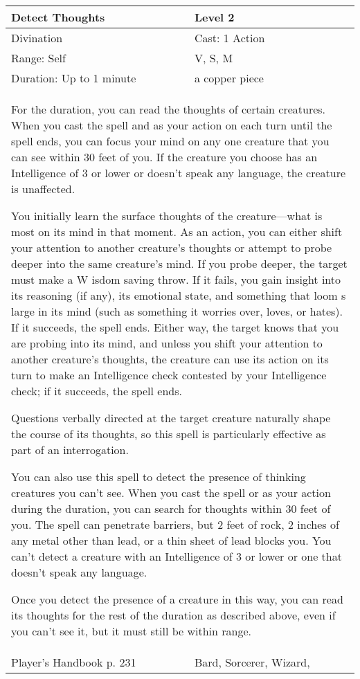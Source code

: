 \documentclass[11pt]{report}
\begin{document}
\begin{table}[H]
	\begin{tabular}{||p{6cm}|p{6cm}||}
		\hline\hline
		\bf{Detect Thoughts} & Level 2\\ \hline
		Divination & Cast: 1 Action\\ \hline
		Range: Self & V, S, M\\ \hline
		Duration: Up to 1 minute & a copper piece\\ \hline
		\multicolumn{2}{||p{12cm}||}{For the duration, you can read the thoughts of certain creatures. 
When you cast the spell and as your action on each turn until the spell ends, you can focus your mind on any one creature that you can see within 30 feet of you. If the creature you choose has an Intelligence of 3 or lower or doesn’t speak any language, the creature is unaffected. 

You initially learn the surface thoughts of the creature—what is most on its mind in that moment. As an action, you can either shift your attention to another creature’s thoughts or attempt to probe deeper into the same creature’s mind. If you probe deeper, the target must make a W isdom saving throw. If it fails, you gain insight into its reasoning (if any), its emotional state, and something that loom s large in its mind (such as something it worries over, loves, or hates). If it succeeds, the spell ends. Either way, the target knows that you are probing into its mind, and unless you shift your attention to another creature’s thoughts, the creature can use its action on its turn to make an Intelligence check contested by your Intelligence check; if it succeeds, the spell ends. 

Questions verbally directed at the target creature naturally shape the course of its thoughts, so this spell is particularly effective as part of an interrogation. 

You can also use this spell to detect the presence of thinking creatures you can’t see. When you cast the spell or as your action during the duration, you can search for thoughts within 30 feet of you. The spell can penetrate barriers, but 2 feet of rock, 2 inches of any metal other than lead, or a thin sheet of lead blocks you. You can’t detect a creature with an Intelligence of 3 or lower or one that doesn’t speak any language. 

Once you detect the presence of a creature in this way, you can read its thoughts for the rest of the duration as described above, even if you can’t see it, but it must still be within range.}\\ \hline
Player's Handbook p. 231 & Bard, Sorcerer, Wizard, \\ \hline\hline
	\end{tabular}
\end{table}
\end{document}
